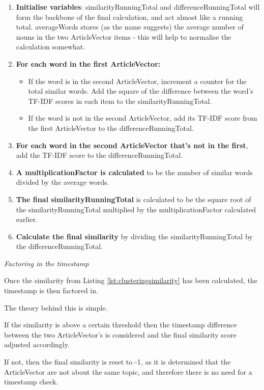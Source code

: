 \documentclass[12pt]{article}
\begin{document}
\begin{enumerate}
	\item \textbf{Initialise variables}: similarityRunningTotal and differenceRunningTotal will form the backbone of the final calculation, and act almost like a running total. averageWords stores (as the name suggests) the average number of nouns in the two ArticleVector items - this will help to normalise the calculation somewhat. 
	\item \textbf{For each word in the first ArticleVector:}
		\begin{itemize}
			\item If the word is in the second ArticleVector, increment a counter for the total similar words. Add the square of the difference between the word's TF-IDF scores in each item to the similarityRunningTotal. 
			\item If the word is not in the second ArticleVector, add its TF-IDF score from the first ArticleVector to the differenceRunningTotal. 
		\end{itemize}
	\item \textbf{For each word in the second ArticleVector that's not in the first}, add the TF-IDF score to the differenceRunningTotal. 
	\item \textbf{A multiplicationFactor is calculated} to be the number of similar words divided by the average words. 
	\item \textbf{The final similarityRunningTotal} is calculated to be the square root of the similarityRunningTotal multiplied by the multiplicationFactor calculated earlier.
	\item \textbf{Calculate the final similarity} by dividing the similarityRunningTotal by the differenceRunningTotal. \\
\end{enumerate}

\emph{Factoring in the timestamp}

Once the similarity from Listing \ref{lst:clusteringsimilarity} has been calculated, the timestamp is then factored in.

The theory behind this is simple. 

If the similarity is above a certain threshold then the timestamp difference between the two ArticleVector's is considered and the final similarity score adjusted accordingly. 

If not, then the final similarity is reset to -1, as it is determined that the ArticleVector are not about the same topic, and therefore there is no need for a timestamp check.
\end{document}

